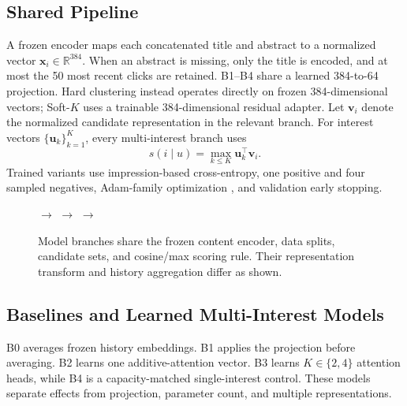 \subsection{Shared Pipeline}
A frozen encoder maps each concatenated title and abstract to a normalized vector $\mathbf{x}_i\in\mathbb{R}^{384}$. When an abstract is missing, only the title is encoded, and at most the 50 most recent clicks are retained. B1--B4 share a learned 384-to-64 projection. Hard clustering instead operates directly on frozen 384-dimensional vectors; Soft-$K$ uses a trainable 384-dimensional residual adapter. Let $\mathbf{v}_i$ denote the normalized candidate representation in the relevant branch. For interest vectors $\{\mathbf{u}_k\}_{k=1}^{K}$, every multi-interest branch uses
\begin{equation}
s(i\mid u)=\max_{k\leq K}\mathbf{u}_k^\top\mathbf{v}_i .
\end{equation}
Trained variants use impression-based cross-entropy, one positive and four sampled negatives, Adam-family optimization \cite{kingma2015adam}, and validation early stopping.

\begin{figure}[t]
\centering
\setlength{\fboxsep}{5pt}
$\longrightarrow$
$\longrightarrow$
$\longrightarrow$
\caption{Model branches share the frozen content encoder, data splits, candidate sets, and cosine/max scoring rule. Their representation transform and history aggregation differ as shown.}
\label{fig:pipeline}
\end{figure}

\subsection{Baselines and Learned Multi-Interest Models}
B0 averages frozen history embeddings. B1 applies the projection before averaging. B2 learns one additive-attention vector. B3 learns $K\in\{2,4\}$ attention heads, while B4 is a capacity-matched single-interest control. These models separate effects from projection, parameter count, and multiple representations.

